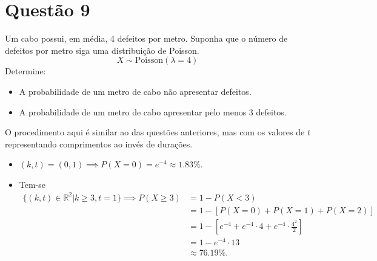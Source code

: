 \section{Questão 9}

Um cabo possui, em média, 4 defeitos por metro. 
Suponha que o número de defeitos por metro siga uma distribuição de Poisson.
$$X\sim \text{Poisson}(\lambda=4)$$
Determine:
%
\begin{itemize}
    \item[a)] A probabilidade de um metro de cabo não apresentar defeitos. 
    \item[b)] A probabilidade de um metro de cabo apresentar pelo menos 3 defeitos. 
\end{itemize}

\begin{respostas}
    O procedimento aqui é similar ao das questões anteriores, mas com os valores de $t$ representando comprimentos ao invés de durações.
    \begin{itemize}
        \item[a)] $(k, t) = (0, 1) \implies P(X=0) = e^{-4} \approx 1.83\%$.
        \item[b)] Tem-se
        \begin{align}
            \{(k, t) \in \mathbb{R}^2 | k\geq 3, t=1\} \implies 
            P(X \geq 3) 
            &= 1 - P(X < 3) \\
            &= 1 - [P(X=0) + P(X=1) + P(X=2)] \\
            &= 1 - \left[e^{-4} + e^{-4} \cdot 4 + e^{-4} \cdot \frac{4^2}{2}\right] \\
            &= 1 - e^{-4} \cdot 13 \\
            &\approx 76.19\%.
        \end{align}
    \end{itemize}
\end{respostas}